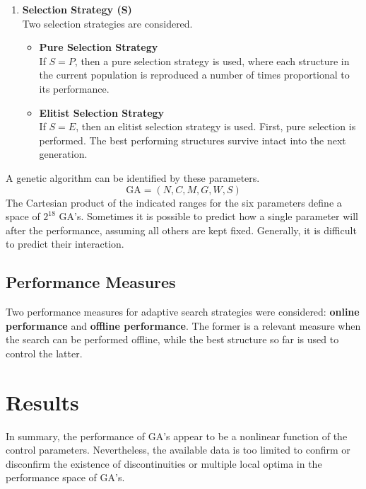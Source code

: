 \documentclass[../main.tex]{subfiles}
\begin{document}
\begin{enumerate}
	\item \textbf{Selection Strategy (S)} \\
	Two selection strategies are considered.
	\begin{itemize}
		\item \textbf{Pure Selection Strategy} \\
		If $S = P$, then a pure selection strategy is used, where each structure in the current population is
		reproduced a number of times proportional to its performance.
		\item \textbf{Elitist Selection Strategy} \\
		If $S = E$, then an elitist selection strategy is used. First, pure selection is performed. The best performing
		structures survive intact into the next generation.
	\end{itemize}
\end{enumerate}
A genetic algorithm can be identified by these parameters.
\[
\text{GA} = (N,C,M,G,W,S)
\]
The Cartesian product of the indicated ranges for the six parameters define a space of $2^{18}$ GA's. Sometimes it is
possible to predict how a single parameter will after the performance, assuming all others are kept fixed. Generally,
it is difficult to predict their interaction.

\subsection{Performance Measures}

Two performance measures for adaptive search strategies were considered: \textbf{online performance} and
\textbf{offline performance}. The former is a relevant measure when the search can be performed offline, while the best
structure so far is used to control the latter.

\section{Results}
In summary, the performance of GA's appear to be a nonlinear function of the control parameters. Nevertheless, the
available data is too limited to confirm or disconfirm the existence of discontinuities or multiple local optima in the
performance space of GA's.
\end{document}
